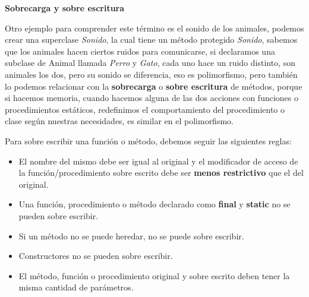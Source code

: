\textbf{Sobrecarga y sobre escritura}

Otro ejemplo para comprender este término es el sonido de los animales, podemos crear una superclase \textit{Sonido}, la cual tiene un método protegido \textit{Sonido}, sabemos que los animales hacen ciertos ruidos para comunicarse, si declaramos una subclase de Animal llamada \textit{Perro} y \textit{Gato}, cada uno hace un ruido distinto, son animales los dos, pero su sonido se diferencia, eso es polimorfismo, pero también lo podemos relacionar con la \textbf{sobrecarga} o \textbf{sobre escritura} de métodos, porque si hacemos memoria, cuando hacemos alguna de las dos acciones con funciones o procedimientos estáticos, redefinimos el comportamiento del procedimiento o clase según nuestras necesidades, es similar en el polimorfismo.

Para sobre escribir una función o método, debemos seguir las siguientes reglas:
\begin{itemize}
    \item El nombre del mismo debe ser igual al original y el modificador de acceso de la función/procedimiento sobre escrito debe ser \textbf{menos restrictivo} que el del original.
    \item Una función, procedimiento o método declarado como \textbf{final} y \textbf{static} no se pueden sobre escribir.
    \item Si un método no se puede heredar, no se puede sobre escribir.
    \item Constructores no se pueden sobre escribir.
    \item El método, función o procedimiento original y sobre escrito deben tener la misma cantidad de parámetros.
\end{itemize}

